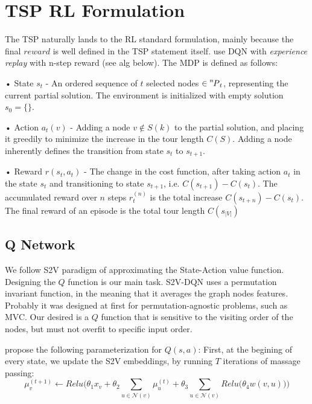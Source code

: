 \documentclass[10pt,a4paper,draft]{article}
\newcommand*\perm[2][^n]{\prescript{#1\mkern-2.5mu}{}P_{#2}}
\begin{document}
\section{TSP RL Formulation}	
The TSP naturally lands to the RL standard formulation, mainly because the final $reward$ is well defined in the TSP statement itself. 
\cite{dai17-tsp-s2v} use DQN with \textit{experience replay} with n-step reward (see alg below). The MDP is defined as follows:
\begin{list}{}{}
	\item[•] State $s_t$ - An ordered sequence of $t$ selected nodes $\in \perm[n]{t}$, representing the current partial solution. The environment is initialized with empty solution $s_0 = \{\}$.
	\item[•] Action $a_t(v)$ - Adding a node $v \not\in S(k)$ to the partial solution, and placing it greedily to minimize the increase in the tour length $C(S)$. Adding a node inherently defines the transition from state $s_t$ to $s_{t+1}$.
	\item[•] Reward $r(s_t,a_t)$ - The change in the cost function, after taking action $a_t$ in the state $s_t$ and transitioning to state $s_{t+1}$, i.e. $C(s_{t+1})-C(s_t)$. The accumulated reward over $n$ steps $r_t^{(n)}$ is the total increase $C(s_{t+n})-C(s_t)$. The final reward of an episode is the total tour length $C(s_{|V|})$
\end{list}


\subsection{Q Network}
We follow S2V paradigm of approximating the State-Action value function.
Designing the $Q$ function is our main task. S2V-DQN uses a permutation invariant function, in the meaning that it averages the graph nodes features. Probably it was designed at first for permutation-agnostic problems, such as MVC. Our desired is a $Q$ function that is sensitive to the visiting order of the nodes, but must not overfit to specific input order. 

\cite{dai17-tsp-s2v} propose the following parameterization for $Q(s,a)$:
First, at the begining of every state, we update the S2V embeddings, by running $T$ iterations of massage passing:
\begin{equation}
	\mu_v^{(t+1)} \leftarrow Relu\Bigg(\theta_1 x_v + \theta_2 \sum_{u \in \mathcal{N}(v)} \mu_u^{(t)} + \theta_3 \sum_{u \in \mathcal{N}(v)} Relu\big(\theta_4 w(v,u)\big)\Bigg)
\end{equation}
\end{document}
